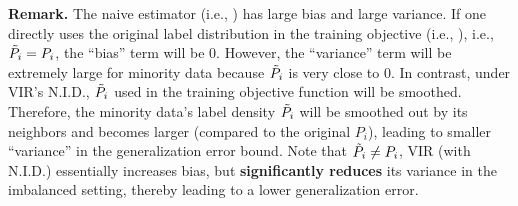 \textbf{Remark.} 
The naive estimator (i.e., ) has large bias and large variance. If one directly uses the original label distribution in the training objective (i.e., ), i.e., $\Tilde{P}_{i}=P_i$, the ``bias'' term will be $0$. However, the ``variance'' term will be extremely large for minority data because $\Tilde{P}_{i}$ is very close to $0$. In contrast, under VIR's N.I.D., $\Tilde{P}_{i}$ used in the training objective function will be smoothed. Therefore, the minority data's label density $\Tilde{P}_{i}$ will be smoothed out by its neighbors and becomes larger (compared to the original $P_i$), leading to smaller ``variance'' in the generalization error bound. Note that $\Tilde{P}_{i} \neq P_i$, VIR (with N.I.D.) essentially increases bias, but \textbf{significantly reduces} its variance in the imbalanced setting, thereby leading to a lower generalization error.
%
